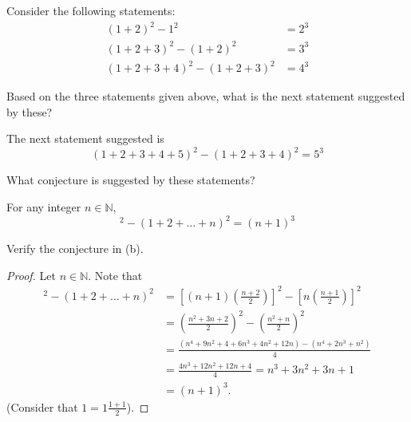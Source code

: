 \documentclass[12pt]{article}
\newcommand{\N}{\mathbb{N}}
\newenvironment{problem}[2][Problem]{\begin{trivlist}
		\item[\hskip \labelsep {\bfseries #1}\hskip \labelsep {\bfseries #2.}]}{\end{trivlist}}
\newenvironment{solution}[2][Solution]{\begin{trivlist}
		\item[\hskip \labelsep {\bfseries #1}\hskip \labelsep {\bfseries #2.}]}{\end{trivlist}}
\begin{document}
	\begin{problem}{2}
		Consider the following statements:
		\begin{align*}
			(1+2)^{2} -1^{2} &= 2^{3}\\
			(1+2+3)^{2}- (1+2)^{2} &= 3^{3}\\
			(1+2+3+4)^{2}- (1+2+3)^{2} &= 4^{3}
		\end{align*}
		\begin{enumerate}[label=(\alph*)]
			\item Based on the three statements given above, what is the next statement suggested by these?
			\begin{solution}{a}
				The next statement suggested is
				\begin{equation*}
					(1+2+3+4+5)^{2} - (1+2+3+4)^{2} = 5^{3}
				\end{equation*}
			\end{solution}
			\item What conjecture is suggested by these statements?
			\begin{solution}{b}
				For any integer $n\in \N$, 
				\begin{equation*}
					[1+2+\ldots+(n+1)]^{2} - (1+2+\ldots+n)^{2} = (n+1)^{3}
				\end{equation*}
			\end{solution}
			\item Verify the conjecture in (b).
			\begin{proof}
				Let $n\in \N$. Note that
				\begin{align*}
					[1+2+\ldots+(n+1)]^{2} - (1+2+\ldots+n)^{2} &= \left[(n+1)\left(\frac{n+2}{2}\right)\right]^{2} - \left[n\left(\frac{n+1}{2}\right)\right]^{2}\\
					&= \left(\frac{n^{2}+3n+2}{2}\right)^{2} - \left(\frac{n^{2}+n}{2}\right)^{2}\\
					&= \frac{(n^{4}+9n^{2}+4+6n^{3}+4n^{2}+12n) - (n^{4}+2n^{3}+n^{2})}{4}\\
					&= \frac{4n^{3}+12n^{2}+12n+4}{4} = n^{3} + 3n^{2} + 3n +1\\
					&= (n+1)^{3}.
				\end{align*}
			(Consider that $1 = 1\frac{1+1}{2}$).
			\end{proof}
		\end{enumerate}
	\end{problem}
\end{document}
